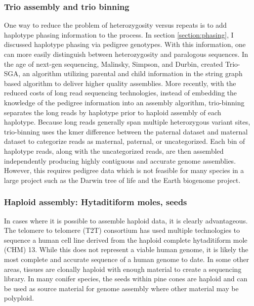 \subsubsection{Trio assembly and trio binning}
\par{
One way to reduce the problem of heterozygosity versus repeats is to add haplotype phasing information to the process. In section \ref{section:phasing}, I discussed haplotype phasing via pedigree genotypes. With this information, one can more easily distinguish between heterozygosity and paralogous sequences. In the age of next-gen sequencing, Malinsky, Simpson, and Durbin, created Trio-SGA, an algorithm utilizing parental and child information in the string graph based algorithm to deliver higher quality assemblies\cite{trio-sga}. More recently, with the reduced costs of long read sequencing technologies, instead of embedding the knowledge of the pedigree information into an assembly algorithm, trio-binning\cite{triobinning} separates the long reads by haplotype prior to haploid assembly of each haplotype. Because long reads generally span multiple heterozygous variant sites, trio-binning uses the kmer difference between the paternal dataset and maternal dataset to categorize reads as maternal, paternal, or uncategorized. Each bin of haplotype reads, along with the uncategorized reads, are then assembled independently producing highly contiguous and accurate genome assemblies. However, this requires pedigree data which is not feasible for many species in a large project such as the Darwin tree of life and the Earth biogenome project.
}

\subsubsection{Haploid assembly: Hytaditiform moles, seeds}

\par{
In cases where it is possible to assemble haploid data, it is clearly advantageous. The telomere to telomere (T2T) consortium has used multiple technologies to sequence a human cell line derived from the haploid complete hytaditiform mole (CHM) 13\cite{T2T2}. While this does not represent a viable human genome, it is likely the most complete and accurate sequence of a human genome to date. In some other areas, tissues are clonally haploid with enough material to create a sequencing library. In many conifer species, the seeds within pine cones are haploid and can be used as source material for genome assembly where other material may be polyploid\cite{coniferhaploid}.
}
